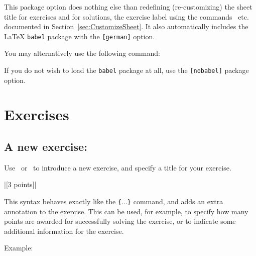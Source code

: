 \documentclass[11pt,a4paper]{article}
\begin{document}
\begin{pkgtip}
  This package option does nothing else than redefining (re-customizing) the sheet title
  for exercises and for solutions, the exercise label using the
  commands~ etc. documented in
  Section~\ref{sec:CustomizeSheet}. It also automatically includes the \LaTeX{}
  \texttt{babel} package with the \texttt{[german]} option.
\end{pkgtip}

You may alternatively use the following command:


\begin{pkgtip}
  If you do not wish to load the \texttt{babel} package at all, use the \texttt{[nobabel]}
  package option.
\end{pkgtip}




\section{Exercises}

\subsection{A new exercise: }

Use~ or~ to introduce a new exercise, and specify a
title for your exercise.

\verbdef\exampleuebungannotation|[3 points]|
%\def\uebungannotprototype{\{$\langle$Exercise %
{%
\def\uebdocNoLabel{}%
%
{ This syntax behaves exactly like the \texttt{\{$\ldots$\}} command, and
  adds an extra annotation to the exercise. This can be used, for example, to specify how
  many points are awarded for successfully solving the exercise, or to indicate some
  additional information for the exercise.

  Example: \exampleuebungannotation
}
}
\end{document}
